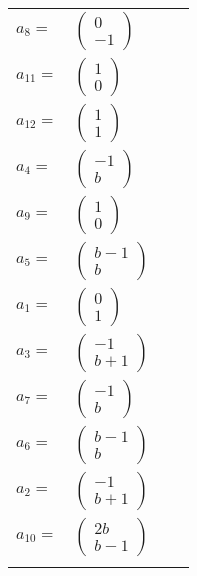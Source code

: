 \documentclass[1p]{elsarticle_modified}
\theoremstyle{definition}
\begin{document}
\begin{tabular}{m{7pt} m{180pt} m{7pt} m{180pt} }
\flushright $a_{8}=$&$\begin{pmatrix}0\\-1\end{pmatrix}$ \\
\flushright $a_{11}=$&$\begin{pmatrix}1\\0\end{pmatrix}$ \\
\flushright $a_{12}=$&$\begin{pmatrix}1\\1\end{pmatrix}$ \\
\flushright $a_{4}=$&$\begin{pmatrix}-1\\b\end{pmatrix}$ \\
\flushright $a_{9}=$&$\begin{pmatrix}1\\0\end{pmatrix}$ \\
\flushright $a_{5}=$&$\begin{pmatrix}b-1\\b\end{pmatrix}$ \\
\flushright $a_{1}=$&$\begin{pmatrix}0\\1\end{pmatrix}$ \\
\flushright $a_{3}=$&$\begin{pmatrix}-1\\b+1\end{pmatrix}$ \\
\flushright $a_{7}=$&$\begin{pmatrix}-1\\b\end{pmatrix}$ \\
\flushright $a_{6}=$&$\begin{pmatrix}b-1\\b\end{pmatrix}$ \\
\flushright $a_{2}=$&$\begin{pmatrix}-1\\b+1\end{pmatrix}$ \\
\flushright $a_{10}=$&$\begin{pmatrix}2 b\\b-1\end{pmatrix}$\\&\end{tabular}
\end{document}
